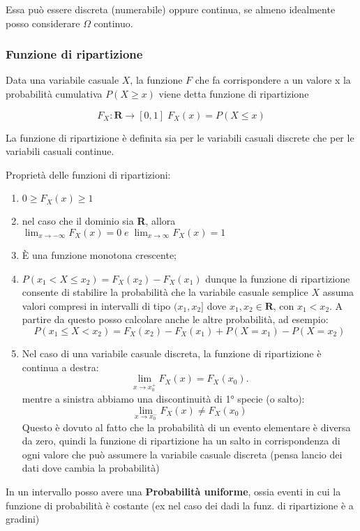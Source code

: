 \documentclass{article}
\begin{document}
Essa può essere discreta (numerabile) oppure continua, se almeno idealmente posso considerare $\Omega$ continuo.

\subsubsection{Funzione di ripartizione}
Data una variabile casuale $X$, la funzione $F$ che fa corrispondere a un valore x la probabilità cumulativa $P(X \geq x)$ viene detta funzione di ripartizione

\[
F_X:\mathbf{R} \rightarrow [0,1] \; F_X(x)=P(X \leq x)
\]

La funzione di ripartizione è definita sia per le variabili casuali discrete che per le variabili casuali
continue.

Proprietà delle funzioni di ripartizioni:
\begin{enumerate}
    \item $0 \geq F_X(x) \geq 1$
    \item nel caso che il dominio sia \textbf{R}, allora $\displaystyle \lim_{x \rightarrow -\infty} F_X(x)=0 \; e \; \lim_{x \rightarrow \infty}F_X(x)=1$
    \item È una funzione monotona crescente;
    \item \( P(x_1 < X \leq x_2) = F_X(x_2) - F_X(x_1) \) dunque la funzione di ripartizione consente di stabilire la probabilità che la variabile casuale semplice \( X \) 
    assuma valori compresi in intervalli di tipo \((x_1, x_2]\) dove \( x_1, x_2 \in \mathbf{R} \), con \( x_1 < x_2 \). A partire da questo posso calcolare anche le altre probabilità, ad esempio:  
    \[ P(x_1 \leq X < x_2) = F_X(x_2) - F_X(x_1) + P(X = x_1) - P(X = x_2)\]
 
    \item Nel caso di una variabile casuale discreta, la funzione di ripartizione è continua a destra:  
    \[ \lim_{x \to x_0^+} F_X(x) = F_X(x_0).\]  
    mentre a sinistra abbiamo una discontinuità di 1° specie (o salto):  
    \[ \lim_{x \to x_0^-} F_X(x) \neq F_X(x_0)\]  
    Questo è dovuto al fatto che la probabilità di un evento elementare è diversa da zero, quindi la funzione di ripartizione ha un salto in corrispondenza di ogni valore che può assumere la variabile casuale discreta (pensa lancio dei dati dove cambia la probabilità)
\end{enumerate}

In un intervallo posso avere una \textbf{Probabilità uniforme}, ossia eventi in cui la funzione di probabilità è costante (ex nel caso dei dadi la funz. di ripartizione è a gradini)
\end{document}
